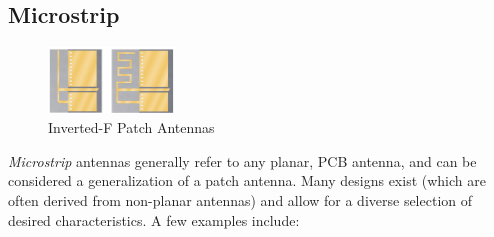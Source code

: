 \subsection{Microstrip}
\begin{figure}[!htb]
  \centering
  \includegraphics[width=0.3\textwidth]{invertedF}
  \caption{Inverted-F Patch Antennas \cite{site-invertedFAntenna}}
  \label{fig:invertedF}
\end{figure}
\textit{Microstrip} antennas generally refer to any planar, PCB antenna, and can be considered a generalization of a patch antenna. Many designs exist (which are often derived from non-planar antennas) and allow for a diverse selection of desired characteristics. A few examples include:
